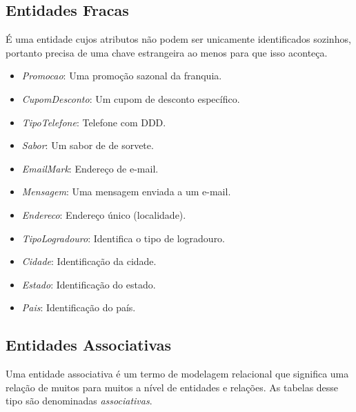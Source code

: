 \subsection{Entidades Fracas}

É uma entidade cujos atributos não podem ser unicamente identificados sozinhos, portanto precisa de uma chave estrangeira ao menos para que isso aconteça. 

\begin{itemize}
\item \emph{Promocao}: Uma promoção sazonal da franquia.
\item \emph{CupomDesconto}: Um cupom de desconto específico.
\item \emph{TipoTelefone}: Telefone com DDD.
\item \emph{Sabor}: Um sabor de de sorvete.
\item \emph{EmailMark}: Endereço de e-mail.
\item \emph{Mensagem}: Uma mensagem enviada a um e-mail.
\item \emph{Endereco}: Endereço único (localidade).
\item \emph{TipoLogradouro}: Identifica o tipo de logradouro.
\item \emph{Cidade}: Identificação da cidade.
\item \emph{Estado}: Identificação do estado.
\item \emph{Pais}: Identificação do país.
\end{itemize}

\subsection{Entidades Associativas}

Uma entidade associativa é um termo de modelagem relacional que significa uma relação de muitos para muitos a nível de entidades e relações. As tabelas desse tipo são denominadas \emph{associativas}.

